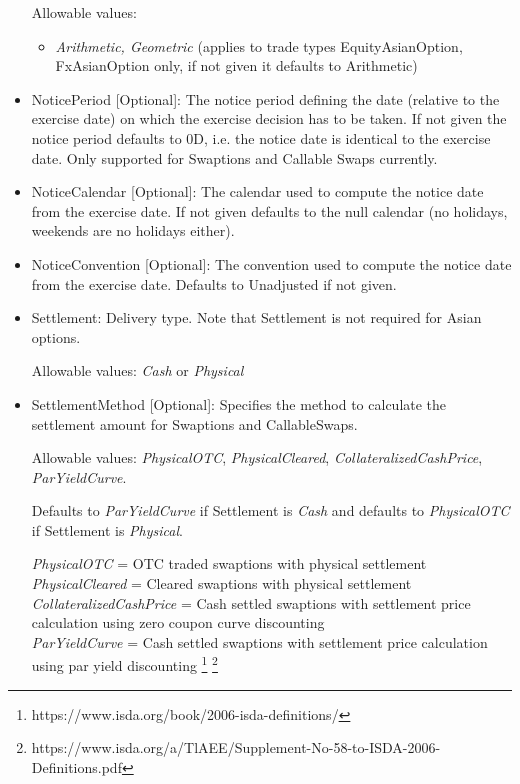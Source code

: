 \begin{itemize}
  Allowable values:
  \begin{itemize}
  \item \emph{Arithmetic, Geometric} (applies to trade types EquityAsianOption, FxAsianOption only, if not given it defaults to Arithmetic)
  \end{itemize}
  
\item NoticePeriod [Optional]: The notice period defining the date (relative to the exercise date) on which the exercise
  decision has to be taken. If not given the notice period defaults to 0D, i.e. the notice date is identical to the
  exercise date. Only supported for Swaptions and Callable Swaps currently.

\item NoticeCalendar [Optional]: The calendar used to compute the notice date from the exercise date. If not given
  defaults to the null calendar (no holidays, weekends are no holidays either).

\item NoticeConvention [Optional]: The convention used to compute the notice date from the exercise date. Defaults to
  Unadjusted if not given.

\item Settlement: Delivery type. Note that Settlement is not required for Asian options.

  Allowable values: \emph{Cash} or \emph{Physical}

\item SettlementMethod [Optional]: Specifies the method to calculate the settlement amount for Swaptions and CallableSwaps.

  Allowable values: \emph{PhysicalOTC}, \emph{PhysicalCleared}, \emph{CollateralizedCashPrice},\\ \emph{ParYieldCurve}. 
  
  Defaults to \emph{ParYieldCurve} if Settlement is \emph{Cash} and defaults to \emph{PhysicalOTC} if Settlement is \emph{Physical}.

\emph{PhysicalOTC} = OTC traded swaptions with physical settlement\\
\emph{PhysicalCleared} = Cleared swaptions with physical settlement\\
\emph{CollateralizedCashPrice} = Cash settled swaptions with settlement price calculation using zero coupon curve discounting \\
\emph{ParYieldCurve}  = Cash settled swaptions with settlement price calculation using par yield discounting \footnote{https://www.isda.org/book/2006-isda-definitions/} \footnote{https://www.isda.org/a/TlAEE/Supplement-No-58-to-ISDA-2006-Definitions.pdf} \\


\end{itemize}
